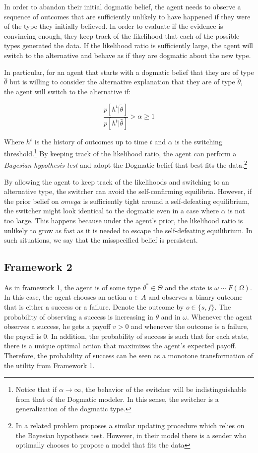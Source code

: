 \documentclass[
  12pt,
]{article}
\begin{document}
In order to abandon their initial dogmatic belief, the agent needs to
observe a sequence of outcomes that are sufficiently unlikely to have
happened if they were of the type they initially believed. In order to
evaluate if the evidence is convincing enough, they keep track of the
likelihood that each of the possible types generated the data. If the
likelihood ratio is sufficiently large, the agent will switch to the
alternative and behave as if they are dogmatic about the new type.

In particular, for an agent that starts with a dogmatic belief that they
are of type \(\hat{\theta}\) but is willing to consider the alternative
explanation that they are of type \(\tilde{\theta}\), the agent will
switch to the alternative if:

\[\frac{p[h^t|\tilde{\theta}]}{p[h^t|\hat{\theta}]} > \alpha\geq 1\]

Where \(h^t\) is the history of outcomes up to time \(t\) and \(\alpha\)
is the switching
threshold.\footnote{Notice that if $\alpha \to \infty$, the behavior of the switcher will be indistinguishable from that of the Dogmatic modeler. 
In this sense, the switcher is a generalization of the dogmatic type.}
By keeping track of the likelihood ratio, the agent can perform a
\emph{Bayesian hypothesis test} and adopt the Dogmatic belief that best
fits the
data.\footnote{In a related problem \citet{Schwarstein2021} proposes a similar updating procedure which relies on the Bayesian 
hypothesis test. However, in their model there is a sender who optimally chooses to propose a model that fits the data}

By allowing the agent to keep track of the likelihoods and switching to
an alternative type, the switcher can avoid the self-confirming
equilibria. However, if the prior belief on \(omega\) is sufficiently
tight around a self-defeating equilibrium, the switcher might look
identical to the dogmatic even in a case where \(\alpha\) is not too
large. This happens because under the agent's prior, the likelihood
ratio is unlikely to grow as fast as it is needed to escape the
self-defeating equilibrium. In such situations, we say that the
misspecified belief is persistent.

\hypertarget{framework-2}{%
\subsection{Framework 2}\label{framework-2}}

As in framework 1, the agent is of some type \(\theta^* \in \Theta\) and
the state is \(\omega \sim F(\Omega)\). In this case, the agent chooses
an action \(a\in A\) and observes a binary outcome that is either a
success or a failure. Denote the outcome by \(o \in \{s,f\}\). The
probability of observing a success is increasing in \(\theta\) and in
\(\omega\). Whenever the agent observes a success, he gets a payoff
\(v>0\) and whenever the outcome is a failure, the payoff is 0. In
addition, the probability of success is such that for each state, there
is a unique optimal action that maximizes the agent's expected payoff.
Therefore, the probability of success can be seen as a monotone
transformation of the utility from Framework 1.
\end{document}
